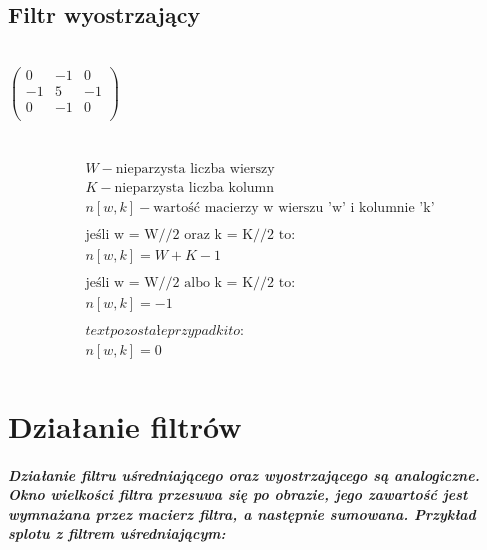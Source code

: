 \documentclass[a4paper,12pt,openany]{report}
\begin{document}
\section{Filtr wyostrzający}
\\
\linebreak
$\begin{pmatrix}
0 & -1 & 0 \\
-1 & 5 & -1 \\
0 & -1 & 0 \\
\end{pmatrix}$
\\
\linebreak
{}
\\
\linebreak
{}
\\
\linebreak
\begin{gather*}
W - \text{nieparzysta liczba wierszy} \\
K - \text{nieparzysta liczba kolumn} \\
n[w, k] - \text{wartość macierzy w wierszu 'w' i kolumnie 'k'} \\
\\
\text{jeśli w = W//2 oraz k = K//2 to:}\\
n[w, k] = W + K - 1\\
\\
\text{jeśli w = W//2 albo k = K//2 to:}\\
n[w, k] = -1\\
\\
text{pozostałe przypadki to:}\\
n[w, k] = 0\\
\end{gather*}


\chapter{Działanie filtrów}

\paragraph{\indent Działanie filtru uśredniającego oraz wyostrzającego są analogiczne. Okno wielkości filtra przesuwa się po obrazie, jego zawartość jest wymnażana przez macierz filtra, a następnie sumowana. Przykład splotu z filtrem uśredniającym:}
\end{document}
